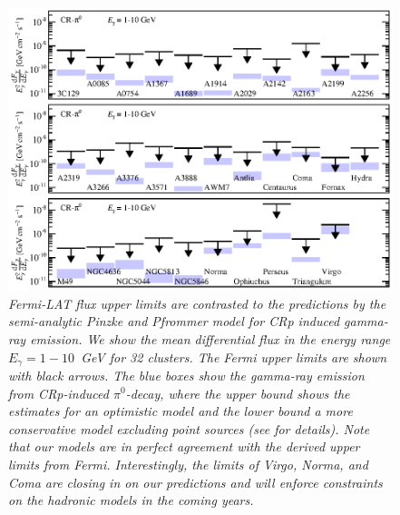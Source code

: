 \documentclass[10pt,aps,pra,reprint,amsmath,amsfonts,amssymb,showpacs]{revtex4-1}
\begin{document}
\begin{figure}
\begin{minipage}{2.0\columnwidth}
  \includegraphics[width=0.99\columnwidth]{figures/Fermi.comp.CR.diff.eps}
  \caption{\it Fermi-LAT flux upper limits are contrasted to the predictions by
    the semi-analytic Pinzke and Pfrommer model for CRp induced gamma-ray
    emission. We show the mean differential flux in the energy range
    $E_\gamma=1-10$~GeV for 32 clusters. The Fermi upper limits are shown with
    black arrows. The blue boxes show the gamma-ray emission from CRp-induced
    $\pi^0$-decay, where the upper bound shows the estimates for an optimistic
    model and the lower bound a more conservative model excluding point sources
    (see \cite{2010MNRAS.409..449P} for details). Note that our models are in
    perfect agreement with the derived upper limits from Fermi. Interestingly,
    the limits of Virgo, Norma, and Coma are closing in on our predictions and
    will enforce constraints on the hadronic models in the coming years.}
 \label{fig15}
\end{minipage}
\end{figure}
\end{document}
